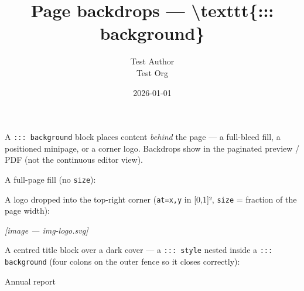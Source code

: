 \documentclass[11pt,a4paper]{article}
\title{Page backdrops — \textbackslash{}texttt\{::: background\}}
\author{Test Author \\ Test Org}
\date{2026-01-01}
\theoremstyle{definition}
\begin{document}
\maketitle

A \texttt{::: background} block places content \emph{behind} the page — a full-bleed
fill, a positioned minipage, or a corner logo. Backdrops show in the
paginated preview / PDF (not the continuous editor view).


A full-page fill (no \texttt{size}):


\begin{tcolorbox}[breakable, colback=gray!5, colframe=gray!50, title=Background]

\end{tcolorbox}


A logo dropped into the top-right corner (\texttt{at=x,y} in [0,1]², \texttt{size} =
fraction of the page width):


\begin{tcolorbox}[breakable, colback=gray!5, colframe=gray!50, title=Background]
\textit{[image — img-logo.svg]}
\end{tcolorbox}


A centred title block over a dark cover — a \texttt{::: style} nested inside a
\texttt{::: background} (four colons on the outer fence so it closes correctly):


\begin{tcolorbox}[breakable, colback=gray!5, colframe=gray!50, title=Background]
\begin{tcolorbox}[breakable, colback=gray!5, colframe=gray!50, title=Style]
Annual report
\end{tcolorbox}
\end{tcolorbox}
\end{document}
